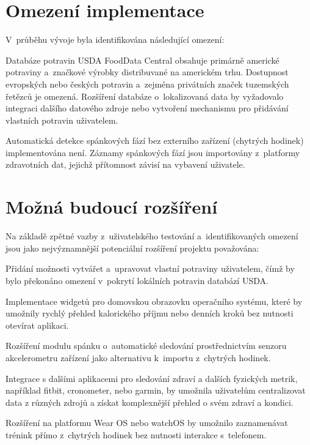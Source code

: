 \section{Omezení implementace}

V~průběhu vývoje byla identifikována následující omezení:

Databáze potravin USDA FoodData Central obsahuje primárně americké potraviny
a~značkové výrobky distribuvané na americkém trhu. Dostupnost evropských
nebo českých potravin a~zejména privátních značek tuzemských řetězců je
omezená. Rozšíření databáze o~lokalizovaná data by vyžadovalo integraci
dalšího datového zdroje nebo vytvoření mechanismu pro přidávání vlastních
potravin uživatelem.

Automatická detekce spánkových fází bez externího zařízení (chytrých hodinek)
implementována není. Záznamy spánkových fází jsou importovány z~platformy
zdravotních dat, jejichž přítomnost závisí na vybavení uživatele.

\section{Možná budoucí rozšíření}

Na základě zpětné vazby z~uživatelského testování a~identifikovaných
omezení jsou jako nejvýznamnější potenciální rozšíření projektu
považována:

Přidání možnosti vytvářet a~upravovat vlastní potraviny uživatelem,
čímž by bylo překonáno omezení v~pokrytí lokálních potravin databází USDA.

Implementace widgetů pro domovskou obrazovku operačního systému,
které by umožnily rychlý přehled kalorického příjmu nebo denních kroků
bez nutnosti otevírat aplikaci.

Rozšíření modulu spánku o~automatické sledování prostřednictvím senzoru
akcelerometru zařízení jako alternativu k~importu z~chytrých hodinek.

Integrace s dalšími aplikacemi pro sledování zdraví a dalších fyzických 
metrik, například fitbit, cronometer, nebo garmin, by umožnila uživatelům 
centralizovat data z různých zdrojů a získat komplexnější přehled o svém 
zdraví a kondici.

Rozšíření na platformu Wear OS nebo watchOS by umožnilo zaznamenávat
trénink přímo z~chytrých hodinek bez nutnosti interakce s~telefonem.
